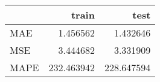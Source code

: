 \begin{tabular}{lrr}
\toprule
{} &       train &        test \\
\midrule
MAE  &    1.456562 &    1.432646 \\
MSE  &    3.444682 &    3.331909 \\
MAPE &  232.463942 &  228.647594 \\
\bottomrule
\end{tabular}
